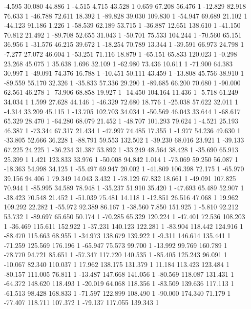 	-4.595 30.080 44.886 1
	-4.515 4.715 43.528 1
	0.659 67.208 56.476 1
	-12.829 82.918 76.633 1
	-46.788 72.611 18.392 1
	-89.828 39.030 109.830 1
	-54.947 69.689 21.102 1
	-44.123 91.186 1.226 1
	-58.539 62.189 53.715 1
	-36.887 12.651 138.610 1
	-41.150 70.812 21.492 1
	-89.708 52.655 31.043 1
	-50.701 75.533 104.244 1
	-70.560 65.151 36.956 1
	-31.576 46.215 39.672 1
	-18.254 70.789 13.344 1
	-39.591 66.973 24.798 1
	-7.277 27.072 46.604 1
	-53.251 71.116 18.879 1
	-65.151 65.833 120.023 1
	-0.298 23.268 45.075 1
	35.638 1.696 32.109 1
	-62.980 73.436 10.611 1
	-71.900 64.383 30.997 1
	-49.091 74.376 16.788 1
	-10.451 50.111 43.459 1
	-13.808 45.756 38.910 1
	-89.559 55.170 32.326 1
	-35.833 57.336 29.290 1
	-89.685 66.200 70.680 1
	-90.000 62.561 46.278 1
	-73.906 68.858 19.927 1
	-14.450 104.164 11.436 1
	-5.718 61.249 34.034 1
	1.599 27.628 44.146 1
	-46.329 72.680 18.776 1
	-25.038 57.622 32.011 1
	-4.314 33.209 45.115 1
	-13.705 102.703 34.034 1
	-50.569 46.043 33.644 1
	-68.617 65.329 28.470 1
	-64.280 68.079 21.452 1
	-48.707 101.293 79.624 1
	-4.521 25.193 46.387 1
	-73.344 67.317 21.434 1
	-47.997 74.485 17.355 1
	-1.977 54.236 49.630 1
	-33.805 52.666 36.228 1
	-88.791 59.553 132.502 1
	-39.230 68.016 23.921 1
	-39.133 67.225 24.225 1
	-36.234 31.387 53.892 1
	-33.249 48.564 38.428 1
	-35.690 65.913 25.399 1
	1.421 123.833 33.976 1
	-50.008 94.842 1.014 1
	-73.069 59.250 56.087 1
	-18.363 54.998 34.125 1
	-55.497 69.947 20.002 1
	-41.809 106.398 72.175 1
	-65.970 39.156 94.406 1
	79.349 14.043 3.432 1
	-78.129 67.832 18.661 1
	-49.091 107.825 70.944 1
	-85.995 34.589 78.948 1
	-35.237 51.910 35.420 1
	-47.693 65.489 52.907 1
	-38.423 70.548 21.452 1
	-51.039 75.481 14.118 1
	-12.851 26.516 47.068 1
	19.962 109.292 22.282 1
	-55.972 92.389 86.167 1
	-38.560 7.850 151.925 1
	-5.810 92.212 53.732 1
	-89.697 65.650 50.174 1
	-70.285 65.329 120.224 1
	-47.401 72.536 108.203 1
	-36.469 115.611 152.922 1
	-37.231 140.123 122.281 1
	-83.904 118.442 124.916 1
	-88.470 115.663 68.955 1
	-34.973 138.679 139.922 1
	-9.311 146.614 135.441 1
	-71.259 125.569 176.196 1
	-65.947 75.573 99.700 1
	-13.992 99.769 160.789 1
	-78.770 94.721 85.651 1
	-57.347 117.720 140.535 1
	-85.405 125.243 96.091 1
	-10.067 82.340 110.037 1
	17.962 138.175 131.379 1
	11.184 113.423 123.484 1
	-80.157 111.005 76.811 1
	-13.487 147.668 141.056 1
	-80.569 118.087 131.431 1
	-64.372 148.620 118.493 1
	-20.019 64.068 118.356 1
	-83.509 139.636 117.113 1
	-61.513 98.428 168.833 1
	-71.597 122.899 108.490 1
	-90.000 174.340 71.179 1
	-77.407 118.711 107.372 1
	-79.137 117.055 139.343 1

